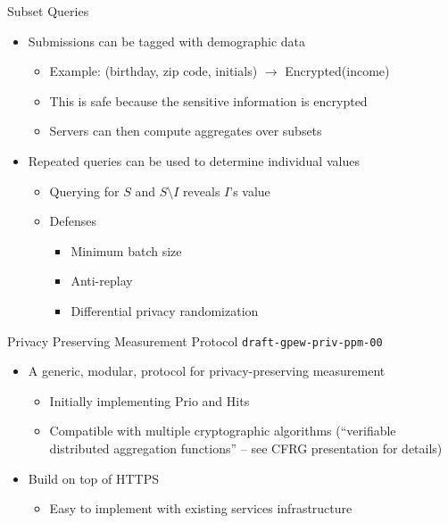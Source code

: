 \documentclass[helvetica]{beamer}
\begin{document}
\begin{frame}{Subset Queries}

  \begin{itemize}
  \item Submissions can be tagged with demographic data
    \begin{itemize}
    \item Example: (birthday, zip code, initials) $\rightarrow$ Encrypted(income)
    \item This is safe because the sensitive information is encrypted      
    \item Servers can then compute aggregates over subsets
    \end{itemize}

  \item Repeated queries can be used to determine individual values
    \begin{itemize}
    \item Querying for $S$ and $S \setminus I$ reveals $I$'s value
    \item Defenses
      \begin{itemize}
      \item Minimum batch size
      \item Anti-replay
      \item Differential privacy randomization
      \end{itemize}
    \end{itemize}
  \end{itemize}
\end{frame}


\begin{frame}{Privacy Preserving Measurement Protocol}
  {\texttt{draft-gpew-priv-ppm-00}}

  \begin{itemize}
  \item A generic, modular, protocol for privacy-preserving measurement
    \begin{itemize}
    \item Initially implementing Prio and Hits      
    \item Compatible with multiple cryptographic algorithms (``verifiable distributed aggregation functions'' -- see CFRG presentation for details)
    \end{itemize}

  \item Build on top of HTTPS
    \begin{itemize}
    \item Easy to implement with existing services infrastructure
    \end{itemize}
  \end{itemize}
\end{frame}
\end{document}
